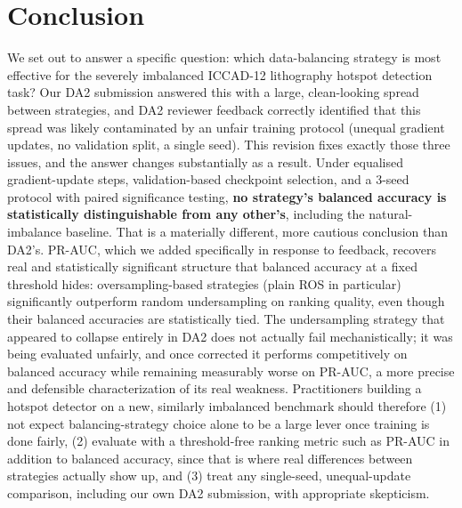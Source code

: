 \documentclass[conference]{IEEEtran}
\begin{document}
\section{Conclusion}
We set out to answer a specific question: which data-balancing
strategy is most effective for the severely imbalanced ICCAD-12
lithography hotspot detection task? Our DA2 submission answered this
with a large, clean-looking spread between strategies, and DA2
reviewer feedback correctly identified that this spread was likely
contaminated by an unfair training protocol (unequal gradient updates,
no validation split, a single seed). This revision fixes exactly those
three issues, and the answer changes substantially as a result. Under
equalised gradient-update steps, validation-based checkpoint selection,
and a 3-seed protocol with paired significance testing, \textbf{no
strategy's balanced accuracy is statistically distinguishable from any
other's}, including the natural-imbalance baseline. That is a
materially different, more cautious conclusion than DA2's. PR-AUC, which we added
specifically in response to feedback, recovers real and statistically
significant structure that balanced accuracy at a fixed threshold
hides: oversampling-based strategies (plain ROS in particular)
significantly outperform random undersampling on ranking quality, even
though their balanced accuracies are statistically tied. The
undersampling strategy that appeared to collapse entirely in DA2 does
not actually fail mechanistically; it was being evaluated unfairly,
and once corrected it performs competitively on balanced accuracy
while remaining measurably worse on PR-AUC, a more precise and
defensible characterization of its real weakness. Practitioners
building a hotspot detector on a new, similarly imbalanced benchmark
should therefore (1) not expect balancing-strategy choice alone to be
a large lever once training is done fairly, (2) evaluate with a
threshold-free ranking metric such as PR-AUC in addition to balanced
accuracy, since that is where real differences between strategies
actually show up, and (3) treat any single-seed, unequal-update
comparison, including our own DA2 submission, with appropriate
skepticism.
\end{document}
